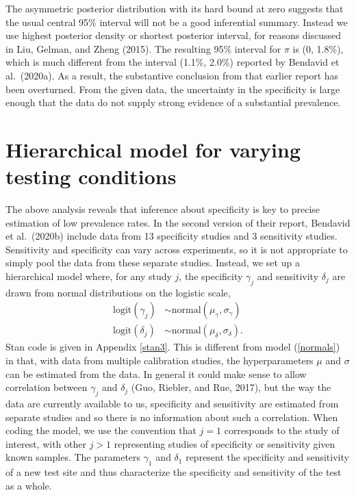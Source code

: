\documentclass[11pt]{article}
\begin{document}
The asymmetric posterior distribution with its hard bound at zero suggests that the usual central 95\% interval will not be a good inferential summary.  Instead we use highest posterior density or shortest posterior interval, for reasons discussed in Liu, Gelman, and Zheng (2015). The resulting 95\% interval for $\pi$ is (0, 1.8\%), which is much different from the interval (1.1\%, 2.0\%) reported by Bendavid et al.\ (2020a).  As a result, the substantive conclusion from that earlier report has been overturned. From the given data, the uncertainty in the specificity is large enough that the data do not supply strong evidence of a substantial prevalence.

\section{Hierarchical model for varying testing conditions}\label{model2}
The above analysis reveals that inference about specificity is key to precise estimation of low prevalence rates.  In the second version of their report, Bendavid et al.\ (2020b) include data from 13 specificity studies and 3 sensitivity studies.  Sensitivity and specificity can vary across experiments, so it is not appropriate to simply pool the data from these separate studies.  Instead, we set up a hierarchical model where, for any study $j$, the specificity $\gamma_j$ and sensitivity $\delta_j$ are drawn from normal distributions on the logistic scale,
\begin{align*}
  \mbox{logit}(\gamma_j) & \sim \mbox{normal}(\mu_{\gamma}, \sigma_{\gamma})\\
 \mbox{logit}(\delta_j) & \sim \mbox{normal}(\mu_{\delta}, \sigma_{\delta}).
\end{align*}
Stan code is given in Appendix \ref{stan3}.
This is different from model (\ref{normals}) in that, with data from multiple calibration studies, the hyperparameters $\mu$ and $\sigma$ can be estimated from the data.  In general it could make sense to allow correlation between $\gamma_j$ and $\delta_j$ (Guo, Riebler, and Rue, 2017), but the way the data are currently available to us, specificity and sensitivity are estimated from separate studies and so there is no information about such a correlation.  When coding the model, we use the convention that $j=1$ corresponds to the study of interest, with other $j > 1$ representing studies of specificity or sensitivity given known samples.  The parameters $\gamma_1$ and $\delta_1$ represent the specificity and sensitivity of a new test site and thus characterize the specificity and sensitivity of the test as a whole.
\end{document}

